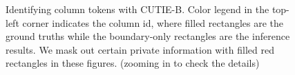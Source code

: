 \documentclass[10pt,twocolumn,letterpaper]{article}
\begin{document}
\begin{figure}
\begin{center}
\end{center}
   \caption{Identifying column tokens with CUTIE-B. Color legend in the top-left corner indicates the column id, where filled rectangles are the ground truths while the boundary-only rectangles are the inference results. We mask out certain private information with filled red rectangles in these figures. (zooming in to check the details)}
\label{fig:column}
\end{figure}
\end{document}
